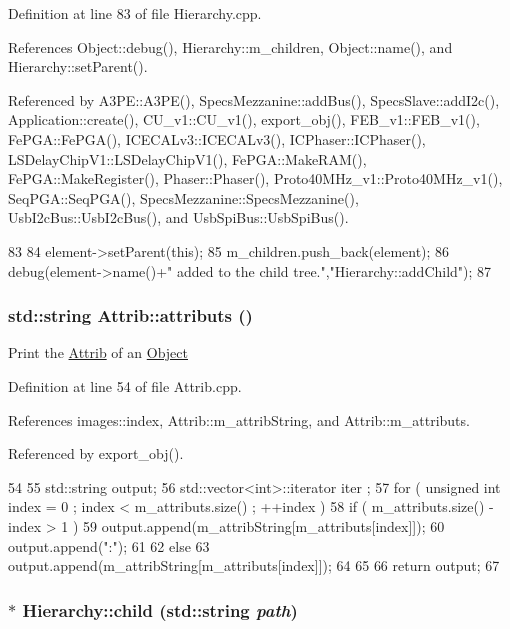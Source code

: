 Definition at line 83 of file Hierarchy.cpp.

References Object::debug(), Hierarchy::m\_\-children, Object::name(), and Hierarchy::setParent().

Referenced by A3PE::A3PE(), SpecsMezzanine::addBus(), SpecsSlave::addI2c(), Application::create(), CU\_\-v1::CU\_\-v1(), export\_\-obj(), FEB\_\-v1::FEB\_\-v1(), FePGA::FePGA(), ICECALv3::ICECALv3(), ICPhaser::ICPhaser(), LSDelayChipV1::LSDelayChipV1(), FePGA::MakeRAM(), FePGA::MakeRegister(), Phaser::Phaser(), Proto40MHz\_\-v1::Proto40MHz\_\-v1(), SeqPGA::SeqPGA(), SpecsMezzanine::SpecsMezzanine(), UsbI2cBus::UsbI2cBus(), and UsbSpiBus::UsbSpiBus().


\begin{DoxyCode}
83                                           {
84   element->setParent(this);
85   m_children.push_back(element);
86   debug(element->name()+" added to the child tree.","Hierarchy::addChild");
87 }
\end{DoxyCode}
\hypertarget{classAttrib_aee7bbf16b144887f196e1341b24f8a26}{
\subsubsection[{attributs}]{\setlength{\rightskip}{0pt plus 5cm}std::string Attrib::attributs ()}}
\label{classAttrib_aee7bbf16b144887f196e1341b24f8a26}
Print the \hyperlink{classAttrib}{Attrib} of an \hyperlink{classObject}{Object} 

Definition at line 54 of file Attrib.cpp.

References images::index, Attrib::m\_\-attribString, and Attrib::m\_\-attributs.

Referenced by export\_\-obj().


\begin{DoxyCode}
54                             {
55   std::string output;
56   std::vector<int>::iterator iter ;
57   for ( unsigned int index = 0 ; index < m_attributs.size() ; ++index ) {
58     if ( m_attributs.size() - index > 1 ) {
59       output.append(m_attribString[m_attributs[index]]);
60       output.append(":");
61     }
62     else {
63       output.append(m_attribString[m_attributs[index]]);
64     }
65   }
66   return output;
67 }
\end{DoxyCode}
\hypertarget{classHierarchy_a1e207f973c694b538bf90107b4868817}{
\subsubsection[{child}]{ $\ast$ Hierarchy::child (std::string {\em path})}}
\label{classHierarchy_a1e207f973c694b538bf90107b4868817}


